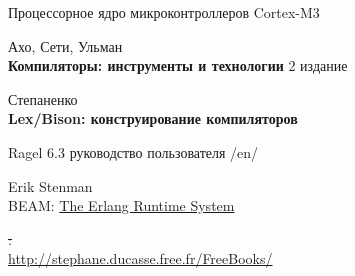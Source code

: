 \begin{thebibliography}{99}

 Процессорное ядро микроконтроллеров Cortex-M3


 Ахо, Сети, Ульман\\
\textbf{Компиляторы: инструменты и технологии} 2 издание

Степаненко\\
\textbf{Lex/Bison: конструирование компиляторов}

Ragel 6.3 руководство пользователя /en/

Erik Stenman\\
BEAM:
\href{https://blog.stenmans.org/theBeamBook/}{The Erlang Runtime System}

\st:\\
\url{http://stephane.ducasse.free.fr/FreeBooks/}

\end{thebibliography}

\secup
